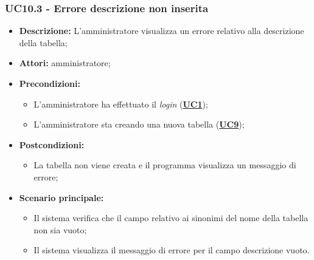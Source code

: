 \subsubsection{UC10.3 - Errore descrizione non inserita}
\label{sec:UC10.3}
\begin{itemize}
	\item \textbf{Descrizione:} L’amministratore visualizza un errore relativo alla descrizione della tabella;
	\item \textbf{Attori:} amministratore;
	\item \textbf{Precondizioni:} 
	\begin{itemize}
		\item L’amministratore ha effettuato il \textit{login} (\hyperref[sec:UC1]{\textbf{UC1}});
		\item L’amministratore sta creando una nuova tabella (\hyperref[sec:UC9]{\textbf{UC9}});
	\end{itemize}
	\item \textbf{Postcondizioni:} 
	\begin{itemize}
		\item La tabella non viene creata e il programma visualizza un messaggio di errore;
	\end{itemize}
	\item \textbf{Scenario principale:} 
	\begin{itemize}
		\item Il sistema verifica che il campo relativo ai sinonimi del nome della tabella non sia vuoto;
		\item Il sistema visualizza il messaggio di errore per il campo descrizione vuoto.
	\end{itemize}
\end{itemize}

